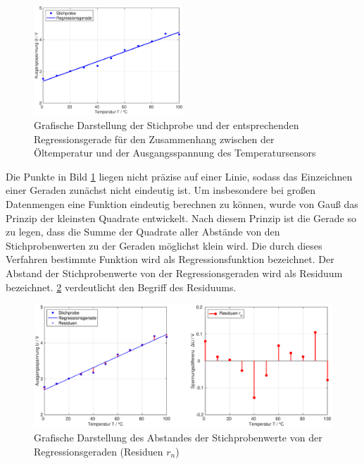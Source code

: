 \noindent 
\begin{figure}[H]
  \centerline{\includegraphics[width=0.5\textwidth]{Kapitel12/Bilder/image3}}
  \caption{Grafische Darstellung der Stichprobe und der entsprechenden Regressionsgerade f\"{u}r den Zusammenhang zwischen der \"{O}ltemperatur und der Ausgangsspannung des Temperatursensors}
  \label{fig:RegressionLinearOeltemperatur}
\end{figure}

\noindent Die Punkte in Bild \ref{fig:RegressionLinearOeltemperatur} liegen nicht pr\"{a}zise auf einer Linie, sodass das Einzeichnen einer Geraden zun\"{a}chst nicht eindeutig ist. Um insbesondere bei gro{\ss}en Datenmengen eine Funktion eindeutig berechnen zu k\"{o}nnen, wurde von Gau{\ss} das Prinzip der kleinsten Quadrate entwickelt. Nach diesem Prinzip ist die Gerade so zu legen, dass die Summe der Quadrate aller Abst\"{a}nde von den Stichprobenwerten zu der Geraden m\"{o}glichst klein wird. Die durch dieses Verfahren bestimmte Funktion wird als Regressionsfunktion bezeichnet. Der Abstand der Stichprobenwerte von der Regressionsgeraden wird als Residuum bezeichnet. \ref{fig:RegressionLinearOeltemperatur2} verdeutlicht den Begriff des Residuums.

\noindent 
\begin{figure}[H]
  \centerline{\includegraphics[width=1\textwidth]{Kapitel12/Bilder/image4}}
  \caption{Grafische Darstellung des Abstandes der Stichprobenwerte von der Regressionsgeraden (Residuen $r_{n}$)}
  \label{fig:RegressionLinearOeltemperatur2}
\end{figure}

